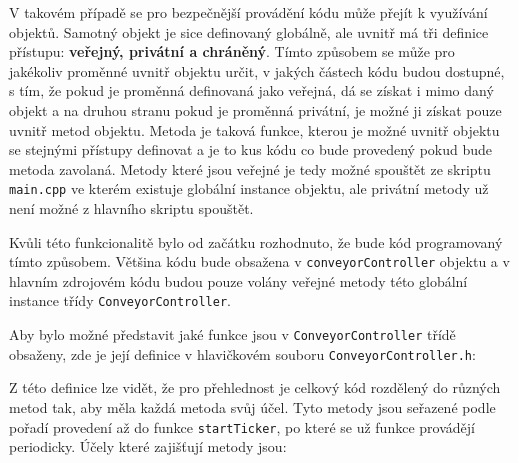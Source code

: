 V takovém případě se pro bezpečnější provádění kódu může přejít k využívání objektů. Samotný objekt je sice definovaný globálně, ale uvnitř má tři definice přístupu: \textbf{veřejný, privátní a chráněný}. Tímto způsobem se může pro jakékoliv proměnné uvnitř objektu určit, v jakých částech kódu budou dostupné, s tím, že pokud je proměnná definovaná jako veřejná, dá se získat i mimo daný objekt a na druhou stranu pokud je proměnná privátní, je možné ji získat pouze uvnitř metod objektu. Metoda je taková funkce, kterou je možné uvnitř objektu se stejnými přístupy definovat a je to kus kódu co bude provedený pokud bude metoda zavolaná. Metody které jsou veřejné je tedy možné spouštět ze skriptu \texttt{main.cpp} ve kterém existuje globální instance objektu, ale privátní metody už není možné z hlavního skriptu spouštět.

Kvůli této funkcionalitě bylo od začátku rozhodnuto, že bude kód programovaný tímto způsobem. Většina kódu bude obsažena v \texttt{conveyorController} objektu a v hlavním zdrojovém kódu budou pouze volány veřejné metody této globální instance třídy \texttt{ConveyorController}.

Aby bylo možné představit jaké funkce jsou v \texttt{ConveyorController} třídě obsaženy, zde je její definice v hlavičkovém souboru \texttt{ConveyorController.h}:



Z této definice lze vidět, že pro přehlednost je celkový kód rozdělený do různých metod tak, aby měla každá metoda svůj účel. Tyto metody jsou seřazené podle pořadí provedení až do funkce \texttt{startTicker}, po které se už funkce provádějí periodicky. Účely které zajišťují metody jsou:


